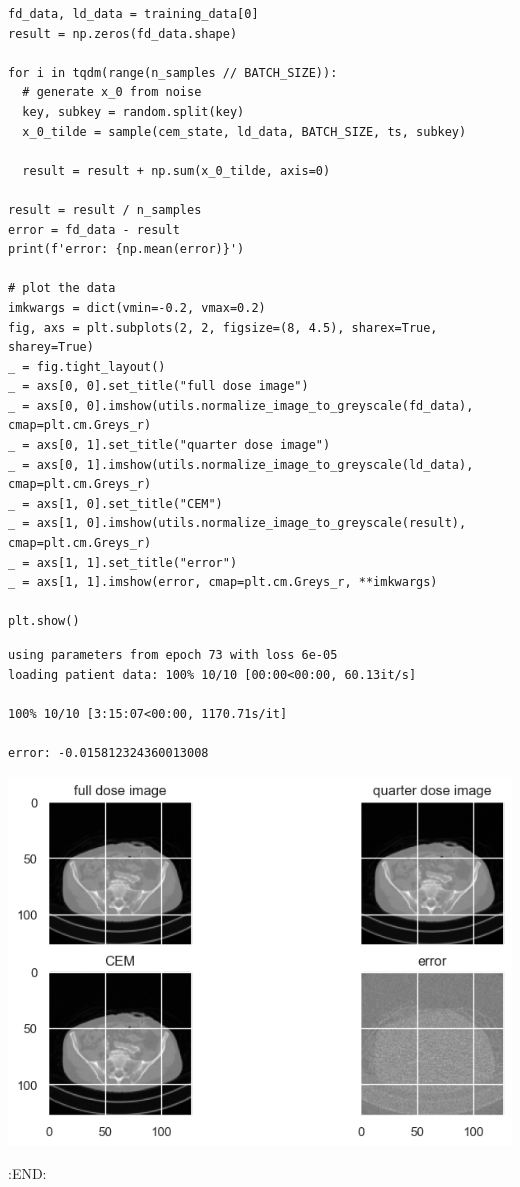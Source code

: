 \documentclass[a4paper, 11pt]{article}
\begin{document}
\begin{verbatim}
fd_data, ld_data = training_data[0]
result = np.zeros(fd_data.shape)

for i in tqdm(range(n_samples // BATCH_SIZE)):
  # generate x_0 from noise
  key, subkey = random.split(key)
  x_0_tilde = sample(cem_state, ld_data, BATCH_SIZE, ts, subkey)

  result = result + np.sum(x_0_tilde, axis=0)

result = result / n_samples
error = fd_data - result
print(f'error: {np.mean(error)}')

# plot the data
imkwargs = dict(vmin=-0.2, vmax=0.2)
fig, axs = plt.subplots(2, 2, figsize=(8, 4.5), sharex=True, sharey=True)
_ = fig.tight_layout()
_ = axs[0, 0].set_title("full dose image")
_ = axs[0, 0].imshow(utils.normalize_image_to_greyscale(fd_data), cmap=plt.cm.Greys_r)
_ = axs[0, 1].set_title("quarter dose image")
_ = axs[0, 1].imshow(utils.normalize_image_to_greyscale(ld_data), cmap=plt.cm.Greys_r)
_ = axs[1, 0].set_title("CEM")
_ = axs[1, 0].imshow(utils.normalize_image_to_greyscale(result), cmap=plt.cm.Greys_r)
_ = axs[1, 1].set_title("error")
_ = axs[1, 1].imshow(error, cmap=plt.cm.Greys_r, **imkwargs)

plt.show()
\end{verbatim}

\begin{verbatim}
using parameters from epoch 73 with loss 6e-05
loading patient data: 100% 10/10 [00:00<00:00, 60.13it/s]

100% 10/10 [3:15:07<00:00, 1170.71s/it]

error: -0.015812324360013008
\end{verbatim}

\begin{center}
\includegraphics[width=.9\linewidth]{./.ob-jupyter/2fc823732f5bee1ceac65ab637b5daee3bbfc03a.png}
\end{center}
:END:
\end{document}
